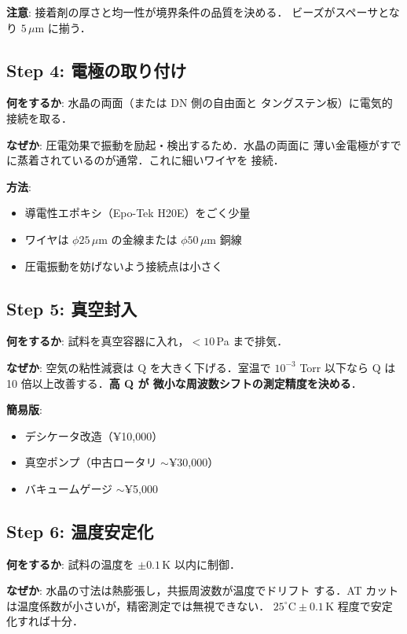 \documentclass[11pt,a4paper]{article}
\begin{document}
\textbf{注意}: 接着剤の厚さと均一性が境界条件の品質を決める．
ビーズがスペーサとなり $5\,\mu$m に揃う．

\subsection{Step 4: 電極の取り付け}

\textbf{何をするか}: 水晶の両面（または DN 側の自由面と
タングステン板）に電気的接続を取る．

\textbf{なぜか}: 圧電効果で振動を励起・検出するため．水晶の両面に
薄い金電極がすでに蒸着されているのが通常．これに細いワイヤを
接続．

\textbf{方法}:
\begin{itemize}
\item 導電性エポキシ（Epo-Tek H20E）をごく少量
\item ワイヤは $\phi 25\,\mu$m の金線または $\phi 50\,\mu$m 銅線
\item 圧電振動を妨げないよう接続点は小さく
\end{itemize}

\subsection{Step 5: 真空封入}

\textbf{何をするか}: 試料を真空容器に入れ，$< 10$\,Pa まで排気．

\textbf{なぜか}: 空気の粘性減衰は Q を大きく下げる．室温で
$10^{-3}$ Torr 以下なら Q は 10 倍以上改善する．\textbf{高 Q が
微小な周波数シフトの測定精度を決める}．

\textbf{簡易版}:
\begin{itemize}
\item デシケータ改造（¥10,000）
\item 真空ポンプ（中古ロータリ $\sim$¥30,000）
\item バキュームゲージ $\sim$¥5,000
\end{itemize}

\subsection{Step 6: 温度安定化}

\textbf{何をするか}: 試料の温度を $\pm 0.1\,$K 以内に制御．

\textbf{なぜか}: 水晶の寸法は熱膨張し，共振周波数が温度でドリフト
する．AT カットは温度係数が小さいが，精密測定では無視できない．
$25^\circ\text{C} \pm 0.1\,\text{K}$ 程度で安定化すれば十分．
\end{document}
